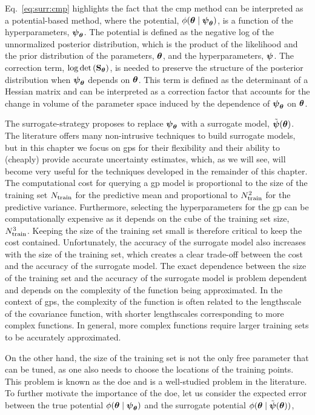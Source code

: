 Eq.~\eqref{eq:surr:cmp} highlights the fact that the \gls{cmp} method can be interpreted as a potential-based method, where the potential, $\phi(\boldsymbol{\theta} \mid \boldsymbol{\psi}_{\boldsymbol{\theta}})$, is a function of the hyperparameters, $\boldsymbol{\psi}_{\boldsymbol{\theta}}$. The potential is defined as the negative log of the unnormalized posterior distribution, which is the product of the likelihood and the prior distribution of the parameters, $\boldsymbol{\theta}$, and the hyperparameters, $\boldsymbol{\psi}$. The correction term, $\log \mathrm{det}\left(\mathbf{S}_{\boldsymbol{\theta}}\right)$, is needed to preserve the structure of the posterior distribution when $\boldsymbol{\psi}_{\boldsymbol{\theta}}$ depends on $\boldsymbol{\theta}$. This term is defined as the determinant of a Hessian matrix and can be interpreted as a correction factor that accounts for the change in volume of the parameter space induced by the dependence of $\boldsymbol{\psi}_{\boldsymbol{\theta}}$ on $\boldsymbol{\theta}$.

\smallskip
The surrogate-strategy proposes to replace $\boldsymbol{\psi}_{\boldsymbol{\theta}}$ with a surrogate model, $\tilde{\boldsymbol{\psi}}(\boldsymbol{\theta})$. The literature offers many non-intrusive techniques to build surrogate models, but in this chapter we focus on \glspl{gp} for their flexibility and their ability to (cheaply) provide accurate uncertainty estimates, which, as we will see, will become very useful for the techniques developed in the remainder of this chapter. The computational cost for querying a \gls{gp} model is proportional to the size of the training set $N_{\mathrm{train}}$ for the predictive mean and proportional to $N_{\mathrm{train}}^2$ for the predictive variance. Furthermore, selecting the hyperparameters for the \gls{gp} can be computationally expensive as it depends on the cube of the training set size, $N_{\mathrm{train}}^3$. Keeping the size of the training set small is therefore critical to keep the cost contained. Unfortunately, the accuracy of the surrogate model also increases with the size of the training set, which creates a clear trade-off between the cost and the accuracy of the surrogate model. The exact dependence between the size of the training set and the accuracy of the surrogate model is problem dependent and depends on the complexity of the function being approximated. In the context of \glspl{gp}, the complexity of the function is often related to the lengthscale of the covariance function, with shorter lengthscales corresponding to more complex functions. In general, more complex functions require larger training sets to be accurately approximated. 

\smallskip
On the other hand, the size of the training set is not the only free parameter that can be tuned, as one also needs to choose the locations of the training points. This problem is known as the \gls{doe} and is a well-studied problem in the literature. To further motivate the importance of the \gls{doe}, let us consider the expected error between the true potential $\phi(\boldsymbol{\theta} \mid \boldsymbol{\psi}_{\boldsymbol{\theta}})$ and the surrogate potential $\phi(\boldsymbol{\theta} \mid \tilde{\boldsymbol{\psi}}(\boldsymbol{\theta}))$,

